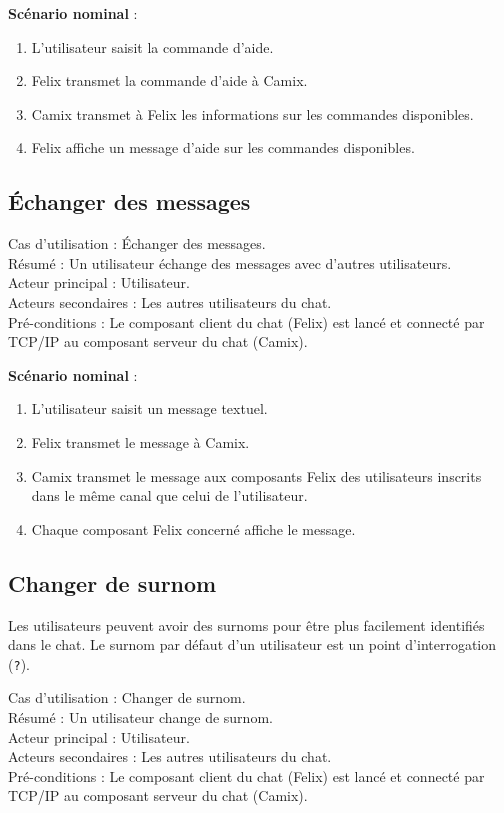 \textbf{Scénario nominal} :
\begin{enumerate}
\item L'utilisateur saisit la commande d'aide.
\item Felix transmet la commande d'aide à Camix.
\item Camix transmet à Felix les informations sur les commandes disponibles.
\item Felix affiche un message d'aide sur les commandes disponibles.
\end{enumerate}

\subsection{Échanger des messages}
\label{sec:cu:echange}

\noindent
Cas d'utilisation : Échanger des messages.\\
Résumé : Un utilisateur échange des messages avec d'autres utilisateurs. \\
Acteur principal : Utilisateur.\\
Acteurs secondaires : Les autres utilisateurs du chat.\\
Pré-conditions : Le composant client du chat (Felix) est lancé et connecté par TCP/IP au composant serveur du chat (Camix).

\medskip
\textbf{Scénario nominal} :
\begin{enumerate}
\item L'utilisateur saisit un message textuel.
\item Felix transmet le message à Camix.
\item Camix transmet le message aux composants Felix des utilisateurs inscrits dans le même canal que celui de l'utilisateur.
\item Chaque composant Felix concerné affiche le message.
\end{enumerate}

\subsection{Changer de surnom}
\label{sec:cu:changersurnom}

Les utilisateurs peuvent avoir des surnoms pour être plus facilement identifiés dans le chat. Le surnom par défaut d'un utilisateur est un point d'interrogation (\texttt{?}).

\medskip
\noindent
Cas d'utilisation : Changer de surnom.\\
Résumé : Un utilisateur change de surnom.\\
Acteur principal : Utilisateur.\\
Acteurs secondaires : Les autres utilisateurs du chat.\\
Pré-conditions : Le composant client du chat (Felix) est lancé et connecté par TCP/IP au composant serveur du chat (Camix).

